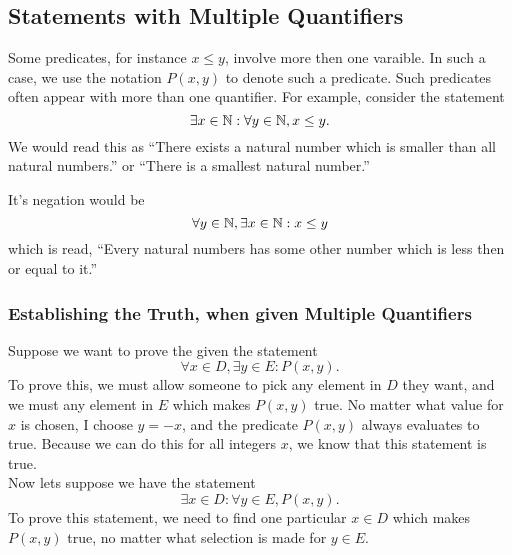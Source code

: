 \documentclass{report}
\begin{document}
\subsection*{Statements with Multiple Quantifiers}
Some predicates, for instance $x\leq y$, involve more then one varaible. In such a case, we use the notation $P(x,y)$ to denote such a predicate. Such predicates often appear with more than one quantifier. For example, consider the statement
$$
	\exists x\in\mathbb{N}: \forall y\in\mathbb{N}, x\leq y.
$$
We would read this as ``There exists a natural number which is smaller than all natural numbers.'' or ``There is a smallest natural number.'' 

\noindent It's negation would be
$$
	\forall y\in\mathbb{N}, \exists x\in\mathbb{N}: x\leq y
$$
which is read, ``Every natural numbers has some other number which is less then or equal to it.''

\subsubsection*{Establishing the Truth, when given Multiple Quantifiers}
Suppose we want to prove the given the statement
$$
	\forall x\in D, \exists y\in E: P(x,y).
$$
To prove this, we must allow someone to pick any element in $D$ they want, and we must any element in $E$ which makes $P(x,y)$ true.
\noindent No matter what value for $x$ is chosen, I choose $y=-x$, and the predicate $P(x,y)$ always evaluates to true. Because we can do this for all integers $x$, we know that this statement is true.\\

\noindent Now lets suppose we have the statement
$$
	\exists x\in D: \forall y\in E, P(x,y).
$$
To prove this statement, we need to find one particular $x\in D$ which makes $P(x,y)$ true, no matter what selection is made for $y\in E$.
\end{document}

